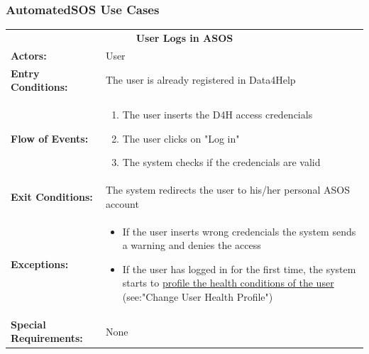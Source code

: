 {\color{Blue}\subsubsection{AutomatedSOS Use Cases}}

\begin{table}[H]
	\centering
	{\renewcommand{\arraystretch}{1.5}%
		\begin{tabular}{|@{\hspace{2em}} p{4cm} @{}| p{11cm} @{\qquad}|}
			\cline{1-2}
			\multicolumn{2}{|c|}{\textbf{User Logs in ASOS}} \\ \cline{1-2}
			\textbf{Actors:} & User \\ \cline{1-2}
			\textbf{Entry Conditions:} & The user is already registered in Data4Help \\ \cline{1-2}
			\textbf{Flow of Events:} & \begin{enumerate}[topsep=0em, itemsep=-0.2em]
				\item The user inserts the D4H access credencials
				\item The user clicks on "Log in"
				\item The system checks if the credencials are valid
			\end{enumerate}\\ \cline{1-2}
			\textbf{Exit Conditions:} & The system redirects the user to his/her personal ASOS account\\ \cline{1-2}
			\textbf{Exceptions:} & \begin{itemize}[topsep=0em, itemsep=-0.2em]
				\item If the user inserts wrong credencials the system sends a warning and denies the access
				\item If the user has logged in for the first time, the system starts to \underline{profile the health conditions of the user} (see:"Change User Health Profile")
			\end{itemize} \\ \cline{1-2}
			\textbf{Special Requirements:} & None \\ \cline{1-2}
	\end{tabular}} \quad
\end{table}

